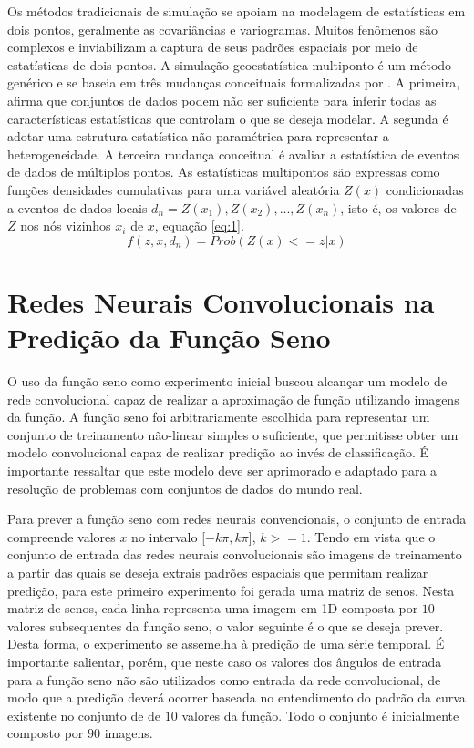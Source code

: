 \documentclass[11pt]{article}
\begin{document}
Os métodos tradicionais de simulação se apoiam na modelagem de estatísticas em dois pontos, geralmente as covariâncias e variogramas. Muitos
fenômenos são complexos e inviabilizam a captura de seus padrões espaciais por meio de estatísticas de dois pontos. A simulação
geoestatística multiponto é um método genérico e se
baseia em três mudanças conceituais formalizadas por \cite{Guardiano1993}. A primeira, afirma que conjuntos de dados podem não ser suficiente
para inferir todas as características estatísticas que controlam o que se deseja modelar. A segunda é adotar uma estrutura estatística
não-paramétrica para representar a heterogeneidade. A terceira mudança conceitual é avaliar a estatística de eventos de dados de múltiplos
pontos. As estatísticas multipontos são expressas como funções densidades cumulativas para uma variável aleatória $Z(x)$ condicionadas
a eventos de dados locais $d_n =  {Z(x_1), Z(x_2),...,Z(x_n)}$, isto é, os valores de $Z$ nos nós vizinhos $x_i$ de $x$, equação \ref{eq:1}.
\begin{equation}
 f(z, x, d_n) = Prob({Z(x)<=z|x})
 \label{eq:1}
\end{equation}


\section{Redes Neurais Convolucionais na Predição da Função Seno}

O uso da função seno como experimento inicial buscou alcançar um modelo de
rede convolucional capaz de realizar a aproximação de função utilizando
imagens da função. A função seno foi arbitrariamente escolhida para
representar um conjunto de treinamento não-linear simples o
suficiente, que permitisse obter um modelo convolucional capaz de realizar predição
ao invés de classificação. É importante ressaltar que este modelo deve ser
aprimorado e adaptado para a resolução de problemas com conjuntos de dados
do mundo real.

Para prever a função seno com redes neurais convencionais, o
conjunto de entrada compreende valores $x$ no intervalo [$-k\pi,k\pi$],
$k >= 1$. Tendo em vista que o conjunto de entrada das redes neurais convolucionais
são imagens de treinamento a partir das quais se deseja extrais padrões espaciais
que permitam realizar predição, para este primeiro experimento foi gerada uma
matriz de senos. Nesta matriz de senos, cada linha representa uma imagem em 1D
composta por $10$ valores subsequentes da função seno, o valor seguinte é o que se
deseja prever. Desta forma, o experimento se assemelha à predição de uma série temporal.
É importante salientar, porém, que neste caso os valores dos ângulos de entrada para a função
seno não são utilizados como entrada da rede convolucional, de modo que a predição
deverá ocorrer baseada no entendimento do padrão da curva existente no conjunto de
de $10$ valores da função. Todo o conjunto é inicialmente composto por $90$ imagens.
\end{document}
